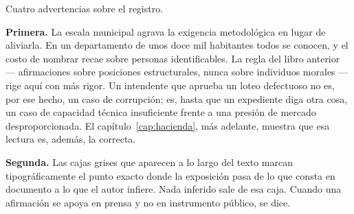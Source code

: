 Cuatro advertencias sobre el registro.

\textbf{Primera.} La escala municipal agrava la exigencia metodológica en lugar de aliviarla. En un departamento de unos doce mil habitantes todos se conocen, y el costo de nombrar recae sobre personas identificables. La regla del libro anterior --- afirmaciones sobre posiciones estructurales, nunca sobre individuos morales --- rige aquí con más rigor. Un intendente que aprueba un loteo defectuoso no es, por ese hecho, un caso de corrupción; es, hasta que un expediente diga otra cosa, un caso de capacidad técnica insuficiente frente a una presión de mercado desproporcionada. El capítulo~\ref{cap:hacienda}, más adelante, muestra que esa lectura es, además, la correcta.

\textbf{Segunda.} Las cajas grises que aparecen a lo largo del texto marcan tipográficamente el punto exacto donde la exposición pasa de lo que consta en documento a lo que el autor infiere. Nada inferido sale de esa caja. Cuando una afirmación se apoya en prensa y no en instrumento público, se dice.

